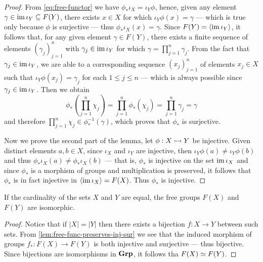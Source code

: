\begin{proof}
From \cref{eq:free-functor} we have \(\phi_{*} \iota_{X} = \iota_{Y} \phi\),
hence, given any element \(\gamma \in \operatorname{im} \iota_{Y} \subseteq F(Y)\), there
exists \(x \in X\) for which \(\iota_{Y} \phi(x) = \gamma\) --- which is true
only because \(\phi\) is surjective --- thus \(\phi_{*} \iota_X(x) = \gamma\).
Since \(F(Y) = \langle \operatorname{im} \iota_Y \rangle\), it follows that, for any given
element \(\gamma \in F(Y)\), there exists a finite sequence of elements
\((\gamma_j)_{j=1}^n\) with \(\gamma_j \in \operatorname{im} \iota_Y\) for which \(\gamma =
\prod_{j=1}^n \gamma_j\). From the fact that \(\gamma_{j} \in \operatorname{im} \iota_Y\), we
are able to a corresponding sequence \((x_j)_{j=1}^n\) of elements \(x_j \in X\)
such that \(\iota_{Y} \phi(x_j) = \gamma_j\) for each \(1 \leq j \leq n\) ---
which is always possible since \(\gamma_j \in \operatorname{im} \iota_Y\). Then we obtain
\[
  \phi_{*}\left( \prod_{j=1}^n \chi_j \right) = \prod_{j=1}^n \phi_{*}(\chi_j)
  = \prod_{j=1}^n \gamma_j = \gamma
\]
and therefore \(\prod_{j=1}^n \chi_j \in \phi_{*}^{-1}(\gamma)\), which proves
that \(\phi_{*}\) is surjective.

Now we prove the second part of the lemma, let \(\phi: X \rightarrowtail Y\) be
injective. Given distinct elements \(a, b \in X\), since \(\iota_X\) and
\(\iota_Y\) are injective, then \(\iota_{Y} \phi(a) \neq \iota_Y \phi(b)\) and
thus \(\phi_{*}\iota_X(a) \neq \phi_{*}\iota_X(b)\) --- that is, \(\phi_{*}\) is
injective on the set \(\operatorname{im} \iota_X\) and since \(\phi_{*}\) is a morphism of
groups and multiplication is preserved, it follows that \(\phi_{*}\) is in fact
injective in \(\langle \operatorname{im} \iota_X \rangle = F(X)\). Thus \(\phi_{*}\) is
injective.
\end{proof}

\begin{proposition}\label{prop:iso-free-grp}
If the cardinality of the sets \(X\) and \(Y\) are equal, the free groups
\(F(X)\) and \(F(Y)\) are isomorphic.
\end{proposition}

\begin{proof}
Notice that if \(|X| = |Y|\) then there exists a bijection \(f: X \to Y\)
between such sets. From \cref{lem:free-func-preserves-inj-sur} we see that the
induced morphism of groups \(f_{*}: F(X) \to F(Y)\) is both injective and
surjective --- thus bijective. Since bijections are isomorphisms in \({\textbf{Grp}}\), it
follows tha \(F(X) \simeq F(Y)\).
\end{proof}

